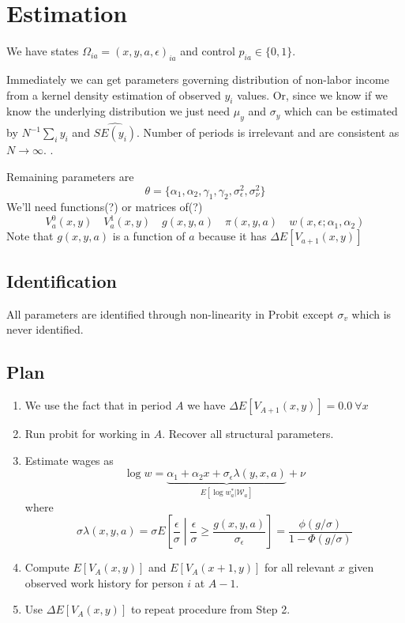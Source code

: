 \documentclass[11pt,letterpaper]{article}
\begin{document}
\section{Estimation}

We have states $\Omega_{ia} = (x,y,a,\epsilon)_{ia}$ and control $p_{ia} \in \{0,1\}$. 

Immediately we can get parameters governing distribution of non-labor income from a kernel density estimation of observed $y_i$ values. Or, since we know if we know the underlying distribution we just need $\mu_y$ and $\sigma_y$ which can be estimated by $N^{-1}\sum\nolimits_i y_i$ and $\widehat{SE(y_i)}$. Number of periods is irrelevant and are consistent as $N\rightarrow \infty$. .

Remaining parameters are
\[
\theta = \{ \alpha_1, \alpha_2, \gamma_1, \gamma_2, \sigma_\epsilon^2, \sigma^2_\nu \}
\]
We'll need functions(?) or matrices of(?)
\[
V_a^0(x,y) \quad V_a^1(x,y) \quad g(x,y,a) \quad \pi(x,y,a) \quad w(x,\epsilon; \alpha_1, \alpha_2)
\]
Note that $g(x,y,a)$ is a function of $a$ because it has $\Delta E[V_{a+1}(x,y)]$

\subsection{Identification}

All parameters are identified through non-linearity in Probit except $\sigma_v$ which is never identified.

\subsection{Plan}
\begin{enumerate}
		\item We use the fact that in period $A$ we have $\Delta E[V_{A+1}(x,y)] = 0.0 \ \forall x$
    \item Run probit for working in $A$. Recover all structural parameters.
    \item Estimate wages as 
    \[
        \log w = \underbrace{\alpha_1 + \alpha_2 x + \sigma_\epsilon \lambda(y,x,a)}_{E[\log w_a^* | \mathcal W_a]} + \nu
    \] 
    where
    \[
        \sigma \lambda(x,y,a) = \sigma E\left[\frac{\epsilon}{\sigma} \middle | \frac{\epsilon}{\sigma} \geq \frac{g(x,y,a)}{\sigma_\epsilon}\right]
        = \frac{\phi(g/\sigma)}{1- \Phi(g/\sigma)}
    \]
    \item Compute $E[V_{A}(x,y)]$ and $E[V_{A}(x+1,y)]$ for all relevant $x$ given observed work history for person $i$ at $A-1$.
    \item Use $\Delta E[V_{A}(x,y)]$ to repeat procedure from Step 2.
\end{enumerate}
\end{document}
